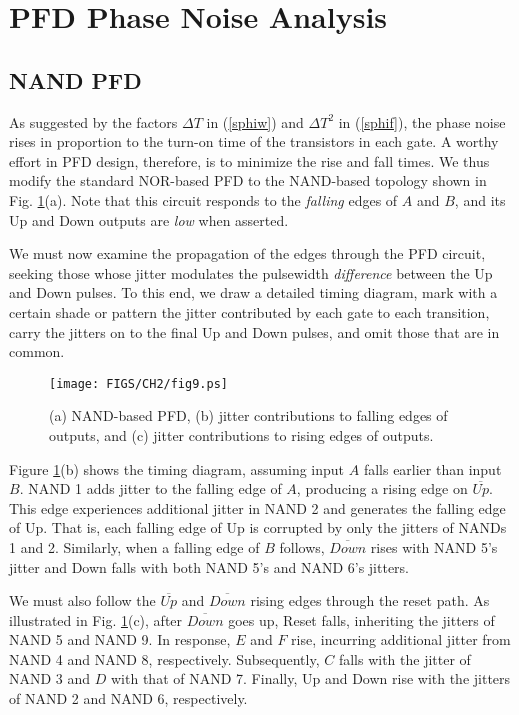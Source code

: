 \section{PFD Phase Noise Analysis}
\subsection{NAND PFD}
As suggested by the factors ${\Delta T}$ in (\ref{sphiw}) and $\Delta T^2$ in (\ref{sphif}), the phase noise rises in proportion to
the turn-on time of the transistors in each gate. A worthy effort in PFD design, therefore, is to minimize the rise and
fall times. We thus modify the standard NOR-based PFD to the NAND-based topology shown in Fig. \ref{fig:pfdnand}(a). Note that this circuit
responds to the {\em falling} edges of $A$ and $B$, and its Up and Down outputs are {\em low} when asserted.

We must now examine the propagation of the edges through the PFD circuit, seeking those whose jitter modulates the
pulsewidth {\em difference} between the Up and Down pulses. To this end, we draw a detailed timing diagram, mark with a certain shade or
pattern the
jitter contributed by each gate to each transition, carry the jitters on to the final Up and Down
pulses, and omit those that are in common.

\begin{figure}[htb!]
\centering
\texttt{[image: FIGS/CH2/fig9.ps]}
\caption{(a) NAND-based PFD, (b) jitter contributions to falling edges of outputs, and (c) jitter contributions to rising edges of outputs.}
\label{fig:pfdnand}
\end{figure}

Figure \ref{fig:pfdnand}(b) shows the timing diagram, assuming input $A$ falls earlier than input $B$. NAND 1 adds jitter to the
falling edge of $A$, producing a rising edge on $\overline{Up}$. This edge experiences additional jitter in NAND 2 and
generates the falling edge of Up. That is, each falling edge of Up is corrupted by only the jitters of NANDs 1 and 2.
Similarly, when a falling edge of $B$ follows, $\overline{ Down}$ rises with NAND 5's jitter and Down falls with both
NAND 5's and NAND 6's jitters.

We must also follow the $\overline{ Up}$ and $\overline{ Down}$ rising edges through the reset path. As illustrated in Fig.
\ref{fig:pfdnand}(c), after $\overline{ Down}$ goes up, Reset falls, inheriting the jitters of NAND 5 and NAND 9. In response, $E$
and $F$ rise, incurring additional jitter from NAND 4 and NAND 8, respectively. Subsequently, $C$ falls with the jitter
of NAND 3 and $D$ with that of NAND 7. Finally, Up and Down rise with the jitters of NAND 2 and NAND 6,
respectively.

